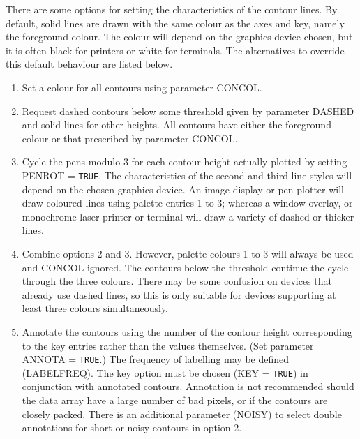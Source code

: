 \documentclass[twoside,11pt]{article}
\newcommand{\sstitem}{\item}
\begin{document}
{{{         \sstitem
         There are some options for setting the characteristics of the
         contour lines.  By default, solid lines are drawn with the same
         colour as the axes and key, namely the foreground colour.  The
         colour will depend on the graphics device chosen, but it is often
         black for printers or white for terminals.  The alternatives to
         override this default behaviour are listed below.

         \begin{enumerate}
         \item Set a colour for all contours using parameter CONCOL.
         \item Request dashed contours below some threshold given by
               parameter DASHED and solid lines for other heights.  All
               contours have either the foreground colour or that
               prescribed by parameter CONCOL.
         \item Cycle the pens modulo 3 for each contour height actually
               plotted by setting PENROT = {\tt TRUE}.  The characteristics of
               the second and third line styles will depend on the chosen
               graphics device.  An image display or pen plotter will draw
               coloured lines using palette entries 1 to 3; whereas a
               window overlay, or monochrome laser printer or terminal
               will draw a variety of dashed or thicker lines.
         \item Combine options 2 and 3.  However, palette colours 1 to 3
               will always be used and CONCOL ignored.  The contours below
               the threshold continue the cycle through the three colours.
               There may be some confusion on devices that already use
               dashed lines, so this is only suitable for devices
               supporting at least three colours simultaneously.
         \item Annotate the contours using the number of the contour height
               corresponding to the key entries rather than the values
               themselves.  (Set parameter ANNOTA = {\tt TRUE}.)  The frequency
               of labelling may be defined (LABELFREQ).  The key option
               must be chosen (KEY = {\tt TRUE}) in conjunction with annotated
               contours.  Annotation is not recommended should the data
               array have a large number of bad pixels, or if the contours
               are closely packed.  There is an additional parameter
               (NOISY) to select double annotations for short or noisy
               contours in option 2.
         \end{enumerate}

}}}
\end{document}
